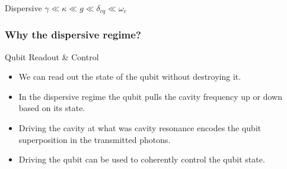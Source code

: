 \documentclass[xetex]{beamer}
\begin{document}
\begin{frame}
  
\end{frame}
\begin{frame}
    \begin{block}{Dispersive}
        $
        \gamma \ll \kappa \ll g \ll \delta_{cq} \ll \omega_c
        $
    \end{block}
\end{frame}
\begin{frame}
    \frametitle{Why the dispersive regime?}
    \begin{block}{Qubit Readout \& Control}
        \begin{itemize}
            \item We can read out the state of the qubit 
                    without destroying it. 
            \item In the dispersive regime the qubit pulls the 
                    cavity frequency up or down based on its state.
            \item Driving the cavity at what was cavity 
                    resonance encodes the qubit superposition 
                    in the transmitted photons. 
            \item Driving the qubit can be used to coherently 
                    control the qubit state. 
        \end{itemize}
    \end{block}
\end{frame}
\end{document}
